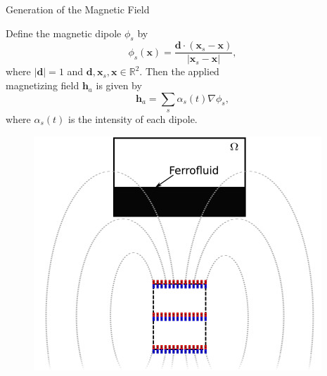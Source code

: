 \documentclass[9pt]{beamer}
\newcommand{\Real}{\mathbb R}
\newcommand{\abs}[1]{\left\vert#1\right\vert}
\newcommand{\grad}{\nabla}
\begin{document}
\begin{frame}{Generation of the Magnetic Field}
\begin{minipage}{.6\paperwidth}
Define the magnetic dipole $\phi_s$ by
$$
\phi_s(\mathbf{x}) = \frac{\mathbf{d}\cdot(\mathbf{x}_s - \mathbf{x})}{\abs{\mathbf{x}_s - \mathbf{x}}}, 
$$
where $\abs{\mathbf{d}}=1$ and $\mathbf{d},\mathbf{x}_s,\mathbf{x}\in\Real^2$. Then the applied\\ magnetizing field $\mathbf{h}_a$ is given by
$$
\mathbf{h}_a = \sum_s \alpha_s(t) \grad\phi_s,
$$
where $\alpha_s(t)$ is the intensity of each dipole.
\end{minipage}%
\begin{minipage}{.3\paperwidth}
\begin{figure}[!b]
\centering
\includegraphics[scale=.4]{MagField.jpg}
\end{figure}
\end{minipage}%
\end{frame}
\end{document}
